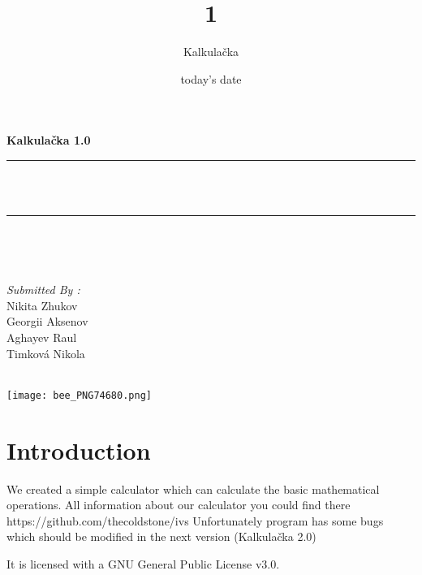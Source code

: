 \documentclass[12pt]{report}
\title{1}
\author{ Kalkulačka}
\date{today's date}
\makeatletter
\let\thetitle\@title
\makeatother
\begin{document}

\begin{titlepage}
	\centering
    \vspace*{0.5 cm}
\begin{center}    \textbf{\Large    Kalkulačka 1.0}\\[2.0 cm]	\end{center}%
	\rule{\linewidth}{0.2 mm} \\[0.4 cm]
	{ \huge \bfseries \thetitle}\\
	\rule{\linewidth}{0.2 mm} \\[1.5 cm]
	
	\begin{minipage}{0.4\textwidth}
		\begin{flushleft} \large
			\end{flushleft}
			\end{minipage}~
			\begin{minipage}{0.4\textwidth}
            
			\begin{flushright} \large
			\emph{Submitted By :} \\
			Nikita Zhukov \\
			Georgii Aksenov \\
			Aghayev Raul \\
			Timková Nikola \\
		\end{flushright}
           
	\end{minipage}\\[2 cm]
	
	\texttt{[image: bee\_PNG74680.png]}
    
    
    
    
	
\end{titlepage}


\tableofcontents
\pagebreak

\renewcommand{\thesection}{\arabic{section}}
\section{Introduction}
 
We created a simple calculator which can calculate the basic mathematical operations. All information about our calculator you could find there https://github.com/thecoldstone/ivs 
Unfortunately program has some bugs which should be modified in the next version (Kalkulačka 2.0)

It is licensed with a GNU General Public License v3.0.
\end{document}
